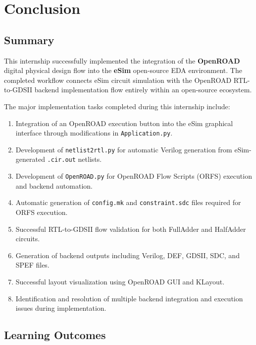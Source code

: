 \chapter{Conclusion}

\section{Summary}

This internship successfully implemented the integration of the \textbf{OpenROAD} digital physical design flow into the \textbf{eSim} open-source EDA environment. The completed workflow connects eSim circuit simulation with the OpenROAD RTL-to-GDSII backend implementation flow entirely within an open-source ecosystem.

The major implementation tasks completed during this internship include:

\begin{enumerate}
    \item Integration of an OpenROAD execution button into the eSim graphical interface through modifications in \texttt{Application.py}.
    
    \item Development of \texttt{netlist2rtl.py} for automatic Verilog generation from eSim-generated \texttt{.cir.out} netlists.
    
    \item Development of \texttt{OpenROAD.py} for OpenROAD Flow Scripts (ORFS) execution and backend automation.
    
    \item Automatic generation of \texttt{config.mk} and \texttt{constraint.sdc} files required for ORFS execution.
    
    \item Successful RTL-to-GDSII flow validation for both FullAdder and HalfAdder circuits.
    
    \item Generation of backend outputs including Verilog, DEF, GDSII, SDC, and SPEF files.
    
    \item Successful layout visualization using OpenROAD GUI and KLayout.
    
    \item Identification and resolution of multiple backend integration and execution issues during implementation.
\end{enumerate}

\section{Learning Outcomes}

